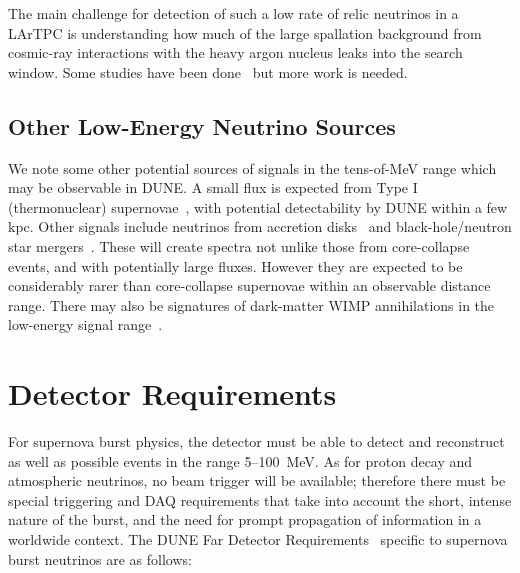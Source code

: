  The main challenge for detection of such
a low rate of relic neutrinos in a LArTPC is understanding how much of
the large spallation background from cosmic-ray interactions with the
heavy argon nucleus 
leaks into the search window.   Some studies have been done~\cite{Barker:2012nb} but more work is needed.

\subsection{Other Low-Energy Neutrino Sources}

We note some other potential sources of signals in the tens-of-MeV
range which may be observable in DUNE.  A small flux is expected from
Type I (thermonuclear) supernovae~\cite{Wright:2016gar,
  Wright:2016xma}, with potential detectability by DUNE within a few
kpc.   Other signals include neutrinos from accretion disks~\cite{Caballero:2011dw} and black-hole/neutron star mergers~\cite{Caballero:2009ww}.  These will create spectra not unlike those from core-collapse events, and with potentially large fluxes.  However they are expected to be considerably rarer than core-collapse supernovae within an observable distance range.  There may also be signatures of dark-matter WIMP annihilations in the low-energy signal range~\cite{Rott:2012qb, Bernal:2012qh}.



\section{Detector Requirements}
\label{sec:physics-snblowe-detector-requirements}

For supernova burst physics, the detector must be able to detect and reconstruct as well as possible events in the range 5--100~MeV.  As for proton decay and atmospheric neutrinos, no beam trigger will be available; therefore there must be special triggering and DAQ requirements that take into account the short, intense nature of the burst, and the need for prompt propagation of information in a worldwide context.
The DUNE Far Detector
Requirements~\cite{lbnfdune-cdr-req} specific to supernova burst neutrinos are as follows:

